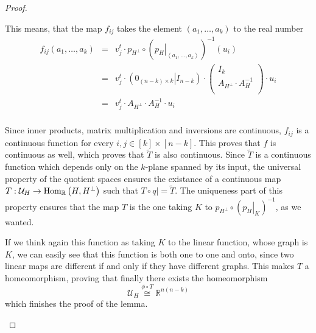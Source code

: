 \begin{proof}
\begin{b_item}
This means, that the map $f_{ij}$ takes the element $\left(a_1,\ldots,a_k\right)$ to the real number
$$\begin{array}{rcl}f_{ij}\left(a_1,\ldots,a_k\right)
&=&v_j^t\cdot p_{H^{\perp}}\circ\left(\left.p_H\right|_{\left<a_1,\ldots,a_k\right>}\right)^{-1}(u_i)\\
&=&v_j^t\cdot\left(\left.0_{(n-k)\times k}\right|I_{n-k}\right)\cdot\left(\begin{array}{c}I_k\\\hline A_{H^{\perp}}\cdot A_H^{-1}\\\end{array}\right)\cdot u_i\\
&=&v_j^t\cdot A_{H^{\perp}}\cdot A_H^{-1}\cdot u_i\\
\end{array}$$

Since inner products, matrix multiplication and inversions are continuous, $f_{ij}$ is a continuous function for every $i,j\in[k]\times[n-k]$. This proves that $f$ is continuous as well, which proves that $\tilde T$ is also continuous. Since $\tilde T$ is a continuous function which depends only on the $k$-plane spanned by its input, the universal property of the quotient spaces ensures the existance of a continuous map $T:\mathcal{U}_H\to\mathrm{Hom}_{\mathbb{R}}\left(H,H^{\perp}\right)$ such that $T\circ \left.q\right|=\tilde T$. The uniqueness part of this property ensures that the map $T$ is the one taking $K$ to $p_{H^{\perp}}\circ\left(\left.p_H\right|_K\right)^{-1}$, as we wanted.

If we think again this function as taking $K$ to the linear function, whose graph is $K$, we can easily see that this function is both one to one and onto, since two linear maps are different if and only if they have different graphs. This makes $T$ a homeomorphism, proving that finally there exists the homeomorphism
$$\mathcal{U}_H\overset{\phi\circ T}{\cong}\mathbb{R}^{n(n-k)}$$
which finishes the proof of the lemma.
\end{b_item}
\end{proof}
